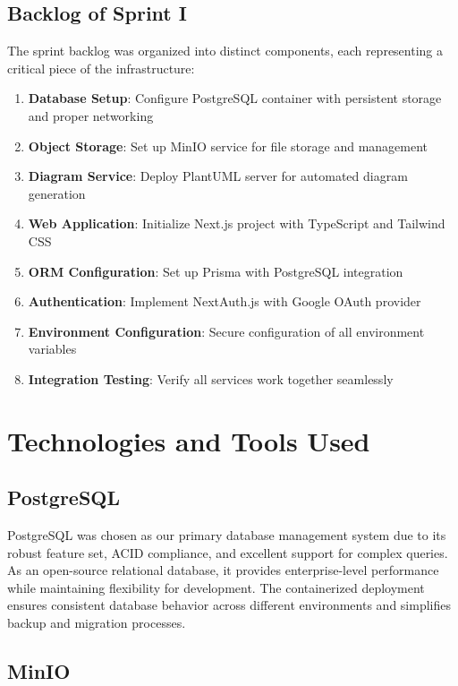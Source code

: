 \subsection{Backlog of Sprint I}

The sprint backlog was organized into distinct components, each representing a critical piece of the infrastructure:

\begin{enumerate}
    \item \textbf{Database Setup}: Configure PostgreSQL container with persistent storage and proper networking
    \item \textbf{Object Storage}: Set up MinIO service for file storage and management
    \item \textbf{Diagram Service}: Deploy PlantUML server for automated diagram generation
    \item \textbf{Web Application}: Initialize Next.js project with TypeScript and Tailwind CSS
    \item \textbf{ORM Configuration}: Set up Prisma with PostgreSQL integration
    \item \textbf{Authentication}: Implement NextAuth.js with Google OAuth provider
    \item \textbf{Environment Configuration}: Secure configuration of all environment variables
    \item \textbf{Integration Testing}: Verify all services work together seamlessly
\end{enumerate}

\section{Technologies and Tools Used}

\subsection{PostgreSQL}

PostgreSQL was chosen as our primary database management system due to its robust feature set, ACID compliance, and excellent support for complex queries. As an open-source relational database, it provides enterprise-level performance while maintaining flexibility for development. The containerized deployment ensures consistent database behavior across different environments and simplifies backup and migration processes.

\subsection{MinIO}

